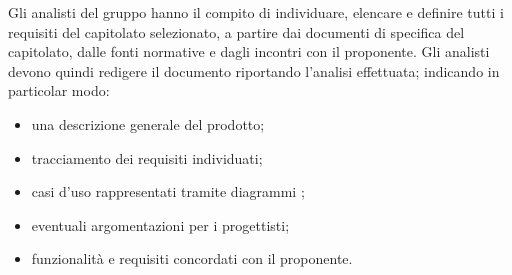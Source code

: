 Gli analisti del gruppo \Gruppo{} hanno il compito di individuare, elencare e definire tutti i requisiti del capitolato selezionato, a partire dai documenti di specifica del capitolato, dalle fonti normative e dagli incontri con il proponente. Gli analisti devono quindi redigere il documento \AdRv{} riportando l'analisi effettuata; indicando in particolar modo:

\begin{itemize}
    \item una descrizione generale del prodotto;
    \item tracciamento dei requisiti individuati;
        \item casi d'uso rappresentati tramite diagrammi ;
    \item eventuali argomentazioni per i progettisti;
    \item funzionalit\`{a} e requisiti concordati con il proponente.
\end{itemize}